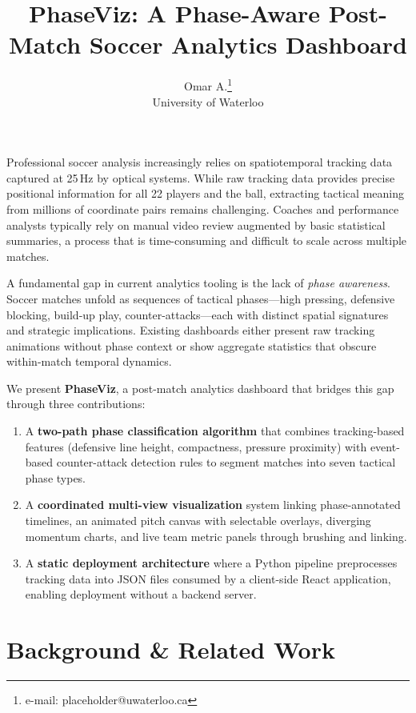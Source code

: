 \documentclass{vgtc}                          %
\title{PhaseViz: A Phase-Aware Post-Match Soccer Analytics Dashboard}
\author{Omar A.\thanks{e-mail: placeholder@uwaterloo.ca}\\
        \scriptsize University of Waterloo}
\begin{document}

\maketitle

Professional soccer analysis increasingly relies on spatiotemporal tracking data captured at 25\,Hz by optical systems. While raw tracking data provides precise positional information for all 22 players and the ball, extracting tactical meaning from millions of coordinate pairs remains challenging. Coaches and performance analysts typically rely on manual video review augmented by basic statistical summaries, a process that is time-consuming and difficult to scale across multiple matches.

A fundamental gap in current analytics tooling is the lack of \emph{phase awareness}. Soccer matches unfold as sequences of tactical phases---high pressing, defensive blocking, build-up play, counter-attacks---each with distinct spatial signatures and strategic implications. Existing dashboards either present raw tracking animations without phase context or show aggregate statistics that obscure within-match temporal dynamics.

We present \textbf{PhaseViz}, a post-match analytics dashboard that bridges this gap through three contributions:
\begin{enumerate}
  \item A \textbf{two-path phase classification algorithm} that combines tracking-based features (defensive line height, compactness, pressure proximity) with event-based counter-attack detection rules to segment matches into seven tactical phase types.
  \item A \textbf{coordinated multi-view visualization} system linking phase-annotated timelines, an animated pitch canvas with selectable overlays, diverging momentum charts, and live team metric panels through brushing and linking.
  \item A \textbf{static deployment architecture} where a Python pipeline preprocesses tracking data into JSON files consumed by a client-side React application, enabling deployment without a backend server.
\end{enumerate}

\section{Background \& Related Work}
\end{document}
